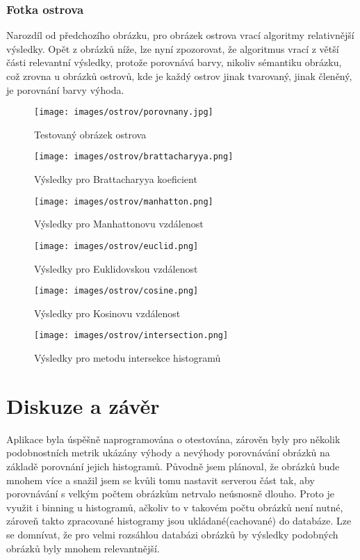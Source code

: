 \documentclass{report}
\begin{document}
	\subsection{Fotka ostrova}
	Narozdíl od předchozího obrázku, pro obrázek ostrova vrací algoritmy relativnější výsledky. Opět z obrázků níže, lze nyní zpozorovat, že algoritmus vrací z větší části relevantní výsledky, protože porovnává barvy, nikoliv sémantiku obrázku, což zrovna u obrázků ostrovů, kde je každý ostrov jinak tvarovaný, jinak členěný, je porovnání barvy výhoda.
	\begin{figure}[ht]
	    \texttt{[image: images/ostrov/porovnany.jpg]}
	    \caption{Testovaný obrázek ostrova}
	    \label{fig:LandscapeFigure}
	\end{figure}
\begin{landscape}
	\begin{figure}
	    \texttt{[image: images/ostrov/brattacharyya.png]}
	    \caption{Výsledky pro Brattacharyya koeficient}
	    \label{fig:LandscapeFigure}
	\end{figure}
	\begin{figure}
	    \texttt{[image: images/ostrov/manhatton.png]}
	    \caption{Výsledky pro Manhattonovu vzdálenost}
	    \label{fig:LandscapeFigure}
	\end{figure}

	\begin{figure}
	    \texttt{[image: images/ostrov/euclid.png]}
	    \caption{Výsledky pro Euklidovskou vzdálenost}
	    \label{fig:LandscapeFigure}
	\end{figure}

	\begin{figure}
	    \texttt{[image: images/ostrov/cosine.png]}
	    \caption{Výsledky pro Kosinovu vzdálenost}
	    \label{fig:LandscapeFigure}
	\end{figure}

	\begin{figure}
	    \texttt{[image: images/ostrov/intersection.png]}
	    \caption{Výsledky pro metodu intersekce histogramů}
	    \label{fig:LandscapeFigure}
	\end{figure}
\end{landscape}

\chapter*{Diskuze a závěr}

Aplikace byla úspěšně naprogramována o otestována, zárověn byly pro několik podobnostních metrik ukázány výhody a nevýhody porovnávání obrázků na základě porovnání jejich histogramů. Původně jsem plánoval, že obrázků bude mnohem více a snažil jsem se kvůli tomu nastavit serverou část tak, aby porovnávání s velkým počtem obrázkům netrvalo neúsnosně dlouho. Proto je využit i binning u histogramů, ačkoliv to v takovém počtu obrázků není nutné, zároveň takto zpracované histogramy jsou ukládané(cachované) do databáze. Lze se domnívat, že pro velmi rozsáhlou databázi obrázků by výsledky podobných obrázků byly mnohem relevantnější.
\end{document}
